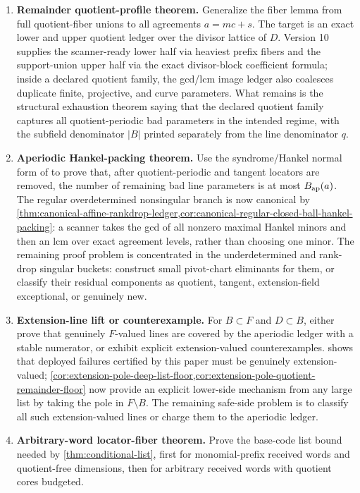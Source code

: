 \documentclass[11pt]{article}
\theoremstyle{definition}
\theoremstyle{remark}
\begin{document}
\begin{enumerate}[label=\textbf{T\arabic*.},leftmargin=2.5em]
\item \textbf{Remainder quotient-profile theorem.}  Generalize the fiber lemma
from full quotient-fiber unions to all agreements $a=mc+s$.  The target is an
exact lower and upper quotient ledger over the divisor lattice of $D$.  Version
10 supplies the scanner-ready lower half via heaviest prefix fibers and the
support-union upper half via the exact divisor-block coefficient formula; inside
a declared quotient family, the gcd/lcm image ledger also coalesces duplicate
finite, projective, and curve parameters.  What remains is the structural
exhaustion theorem saying that the declared quotient family captures all
quotient-periodic bad parameters in the intended regime, with the subfield
denominator $|B|$ printed separately from the line denominator $q$.

\item \textbf{Aperiodic Hankel-packing theorem.}  Use the syndrome/Hankel normal
form of \cite{Cho26b} to prove that, after quotient-periodic and tangent
locators are removed, the number of remaining bad line parameters is at most
$B_{\rm ap}(a)$.  The regular overdetermined nonsingular branch is now
canonical by \cref{thm:canonical-affine-rankdrop-ledger,cor:canonical-regular-closed-ball-hankel-packing}: a scanner takes the gcd of all nonzero maximal
Hankel minors and then an lcm over exact agreement levels, rather than choosing
one minor.  The remaining proof problem is concentrated in the underdetermined
and rank-drop singular buckets: construct small pivot-chart eliminants for them,
or classify their residual components as quotient, tangent, extension-field
exceptional, or genuinely new.

\item \textbf{Extension-line lift or counterexample.}  For $B\subset F$ and
$D\subset B$, either prove that genuinely $F$-valued lines are covered by the
aperiodic ledger with a stable numerator, or exhibit explicit extension-valued
counterexamples.   shows that deployed failures certified by
this paper must be genuinely extension-valued; \cref{cor:extension-pole-deep-list-floor,cor:extension-pole-quotient-remainder-floor}
now provide an explicit lower-side mechanism from any large list by taking the
pole in $F\setminus B$.  The remaining safe-side problem is to classify all such
extension-valued lines or charge them to the aperiodic ledger.

\item \textbf{Arbitrary-word locator-fiber theorem.}  Prove the base-code list
bound needed by \cref{thm:conditional-list}, first for monomial-prefix received
words and quotient-free dimensions, then for arbitrary received words with
quotient cores budgeted.


\end{enumerate}
\end{document}

